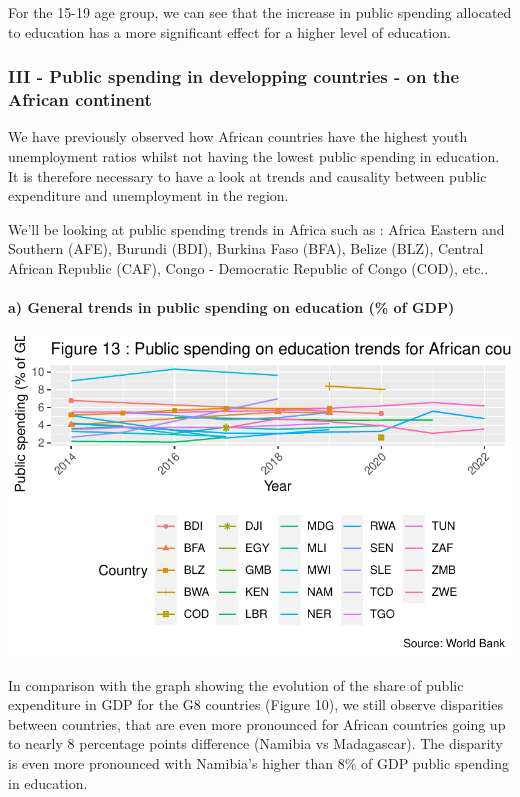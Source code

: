 \documentclass[
  letterpaper,
  DIV=11,
  numbers=noendperiod]{scrartcl}
\let\oldparagraph\paragraph
\renewcommand{\paragraph}[1]{\oldparagraph{#1}\mbox{}}
\begin{document}
For the 15-19 age group, we can see that the increase in public spending
allocated to education has a more significant effect for a higher level
of education.

\hypertarget{iii---public-spending-in-developping-countries---on-the-african-continent}{%
\subsubsection{III - Public spending in developping countries - on the
African
continent}\label{iii---public-spending-in-developping-countries---on-the-african-continent}}

We have previously observed how African countries have the highest youth
unemployment ratios whilst not having the lowest public spending in
education. It is therefore necessary to have a look at trends and
causality between public expenditure and unemployment in the region.

We'll be looking at public spending trends in Africa such as : Africa
Eastern and Southern (AFE), Burundi (BDI), Burkina Faso (BFA), Belize
(BLZ), Central African Republic (CAF), Congo - Democratic Republic of
Congo (COD), etc..

\hypertarget{a-general-trends-in-public-spending-on-education-of-gdp}{%
\paragraph{a) General trends in public spending on education (\% of
GDP)}\label{a-general-trends-in-public-spending-on-education-of-gdp}}

\includegraphics{Projet-BM_files/figure-pdf/unnamed-chunk-27-1.pdf}

In comparison with the graph showing the evolution of the share of
public expenditure in GDP for the G8 countries (Figure 10), we still
observe disparities between countries, that are even more pronounced for
African countries going up to nearly 8 percentage points difference
(Namibia vs Madagascar). The disparity is even more pronounced with
Namibia's higher than 8\% of GDP public spending in education.
\end{document}
